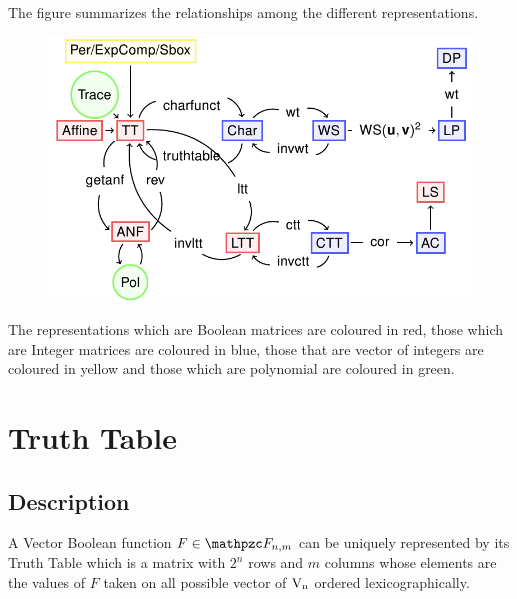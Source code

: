 The figure summarizes the relationships among the different representations.

\begin{figure}
\centerline{\includegraphics[width=\textwidth]{relationshipsrep}}
\label{fig:relationshipsrep}
\end{figure}

The representations which are Boolean matrices are coloured in red, those which are Integer matrices are coloured in blue, those that are vector of integers are coloured in yellow and those which are polynomial are coloured in green.

\section{Truth Table}
\label{sec:TT}

\subsection{Description}

A Vector Boolean function $F \in \funct{F}_{n,m}$ can be uniquely represented by its Truth Table which is a matrix with $2^n$ rows and $m$ columns whose elements are the values of $F$ taken on all possible vector of $\gf{V_n}$ ordered lexicographically.

